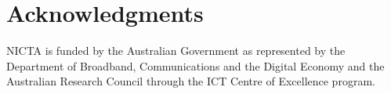 \documentclass{sig-alternate}
\begin{document}
\section{Acknowledgments}
NICTA is funded by the Australian Government as represented by the Department of Broadband, Communications and the Digital Economy and the Australian Research Council through the ICT Centre of Excellence program.
%

%
%
\end{document}
